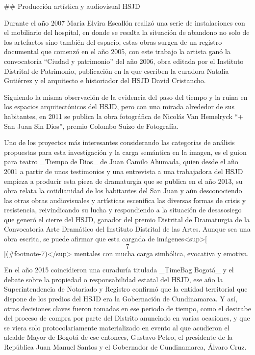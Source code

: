 ## Producción artística y audiovisual HSJD

Durante el año 2007 María Elvira Escallón realizó una serie de instalaciones con el mobiliario del hospital, en donde se resalta la situación de abandono no solo de los artefactos sino también del espacio, estas obras surgen de un registro documental que comenzó en el año 2005, con este trabajo la artista ganó la convocatoria “Ciudad y patrimonio” del año 2006, obra editada por el Instituto Distrital de Patrimonio, publicación en la que escriben la curadora Natalia Gutiérrez y el arquitecto e historiador del HSJD David Cristancho.

Siguiendo la misma observación de la evidencia del paso del tiempo y la ruina en los espacios arquitectónicos del HSJD, pero con una mirada alrededor de sus habitantes, en 2011 se publica la obra fotográfica de Nicolás Van Hemelryck “+ San Juan Sin Dios”, premio Colombo Suizo de Fotografía.

Uno de los proyectos más interesantes considerando las categorías de análisis propuestas para esta investigación y la carga semántica en la imagen, es el guion para teatro _Tiempo de Dios_ de Juan Camilo Ahumada, quien desde el año 2001 a partir de unos testimonios y una entrevista a una trabajadora del HSJD empieza a producir esta pieza de dramaturgia que se publica en el año 2013, su obra relata la cotidianidad de los habitantes del San Juan y aún desconociendo las otras obras audiovisuales y artísticas escenifica las diversas formas de crisis y resistencia, reivindicando su lucha y respondiendo a la situación de desasosiego que generó el cierre del HSJD, ganador del premio Distrital de Dramaturgia de la Convocatoria Arte Dramático del Instituto Distrital de las Artes. Aunque sea una obra escrita, se puede afirmar que esta cargada de imágenes<sup>[\[7\]](#footnote-7)</sup> mentales con mucha carga simbólica, evocativa y emotiva.

En el año 2015 coincidieron una curaduría titulada _TimeBag Bogotá_ y el debate sobre la propiedad o responsabilidad estatal del HSJD, ese año la Superintendencia de Notariado y Registro confirmó que la entidad territorial que dispone de los predios del HSJD era la Gobernación de Cundinamarca. Y así, otras decisiones claves fueron tomadas en ese periodo de tiempo, como el destrabe del proceso de compra por parte del Distrito anunciado en varias ocasiones, y que se viera solo protocolariamente materializado en evento al que acudieron el alcalde Mayor de Bogotá de ese entonces, Gustavo Petro, el presidente de la República Juan Manuel Santos y el Gobernador de Cundinamarca, Álvaro Cruz.

